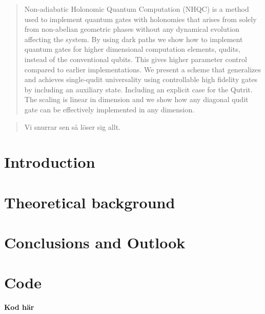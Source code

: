 \documentclass[a4paper, 12pt]{article}
\newcommand{\note}[1]{{\color{red}\textbf{#1} } }
\begin{document}
\begin{abstract}
Non-adiabatic Holonomic Quantum Computation (NHQC) is a method used to implement quantum gates with holonomies that arises from solely from non-abelian geometric phases without any dynamical evolution affecting the system. By using dark paths we show how to implement quantum gates for higher dimensional computation elements, qudits, instead of the conventional qubits. This gives higher parameter control  compared to earlier implementations. We present a scheme that generalizes and achieves single-qudit universality using controllable high fidelity gates by including an auxiliary state. Including an explicit case for the Qutrit. The scaling is linear in dimension and we show how any diagonal qudit gate can be effectively implemented in any dimension.
\end{abstract}

\bigskip

\bigskip

\bigskip

\bigskip

\begin{otherlanguage}{swedish}
\begin{abstract}
Vi snurrar sen så löser sig allt.
\end{abstract}
\end{otherlanguage}

\newpage\null\newpage %

\tableofcontents

\newpage\null\newpage %


\section{Introduction}



\section{Theoretical background}




\section{Conclusions and Outlook}



\newpage


\newpage

\appendix

\section{Code}
\note{Kod här}
\end{document}
